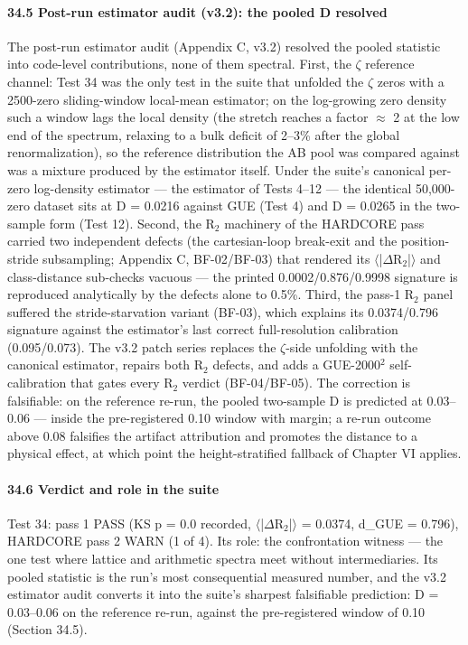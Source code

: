 \documentclass[10pt]{article}
\begin{document}
\paragraph{34.5 Post-run estimator audit (v3.2): the pooled D resolved}

The post-run estimator audit (Appendix C, v3.2) resolved the pooled statistic into code-level contributions, none of them spectral. First, the $\zeta$ reference channel: Test 34 was the only test in the suite that unfolded the $\zeta$ zeros with a 2500-zero sliding-window local-mean estimator; on the log-growing zero density such a window lags the local density (the stretch reaches a factor $\approx$ 2 at the low end of the spectrum, relaxing to a bulk deficit of 2--3\% after the global renormalization), so the reference distribution the AB pool was compared against was a mixture produced by the estimator itself. Under the suite's canonical per-zero log-density estimator --- the estimator of Tests 4--12 --- the identical 50,000-zero dataset sits at D = 0.0216 against GUE (Test 4) and D = 0.0265 in the two-sample form (Test 12). Second, the R$_2$ machinery of the HARDCORE pass carried two independent defects (the cartesian-loop break-exit and the position-stride subsampling; Appendix C, BF-02/BF-03) that rendered its $\langle$|$\Delta$R$_2$|$\rangle$ and class-distance sub-checks vacuous --- the printed 0.0002/0.876/0.9998 signature is reproduced analytically by the defects alone to 0.5\%. Third, the pass-1 R$_2$ panel suffered the stride-starvation variant (BF-03), which explains its 0.0374/0.796 signature against the estimator's last correct full-resolution calibration (0.095/0.073). The v3.2 patch series replaces the $\zeta$-side unfolding with the canonical estimator, repairs both R$_2$ defects, and adds a GUE-2000$^2$ self-calibration that gates every R$_2$ verdict (BF-04/BF-05). The correction is falsifiable: on the reference re-run, the pooled two-sample D is predicted at 0.03--0.06 --- inside the pre-registered 0.10 window with margin; a re-run outcome above 0.08 falsifies the artifact attribution and promotes the distance to a physical effect, at which point the height-stratified fallback of Chapter VI applies.

\paragraph{34.6 Verdict and role in the suite}

Test 34: pass 1 PASS (KS p = 0.0 recorded, $\langle$|$\Delta$R$_2$|$\rangle$ = 0.0374, d\_GUE = 0.796), HARDCORE pass 2 WARN (1 of 4). Its role: the confrontation witness --- the one test where lattice and arithmetic spectra meet without intermediaries. Its pooled statistic is the run's most consequential measured number, and the v3.2 estimator audit converts it into the suite's sharpest falsifiable prediction: D = 0.03--0.06 on the reference re-run, against the pre-registered window of 0.10 (Section 34.5).
\end{document}
